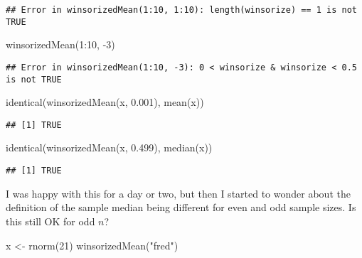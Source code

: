 \documentclass[
]{article}
\newenvironment{Shaded}{\begin{snugshade}}{\end{snugshade}}
\newcommand{\DecValTok}[1]{\textcolor[rgb]{0.00,0.00,0.81}{#1}}
\newcommand{\FloatTok}[1]{\textcolor[rgb]{0.00,0.00,0.81}{#1}}
\newcommand{\FunctionTok}[1]{\textcolor[rgb]{0.00,0.00,0.00}{#1}}
\newcommand{\NormalTok}[1]{#1}
\newcommand{\OtherTok}[1]{\textcolor[rgb]{0.56,0.35,0.01}{#1}}
\newcommand{\SpecialCharTok}[1]{\textcolor[rgb]{0.00,0.00,0.00}{#1}}
\newcommand{\StringTok}[1]{\textcolor[rgb]{0.31,0.60,0.02}{#1}}
\begin{document}
\begin{verbatim}
## Error in winsorizedMean(1:10, 1:10): length(winsorize) == 1 is not TRUE
\end{verbatim}

\begin{Shaded}
\begin{Highlighting}[]
\FunctionTok{winsorizedMean}\NormalTok{(}\DecValTok{1}\SpecialCharTok{:}\DecValTok{10}\NormalTok{, }\SpecialCharTok{{-}}\DecValTok{3}\NormalTok{)}
\end{Highlighting}
\end{Shaded}

\begin{verbatim}
## Error in winsorizedMean(1:10, -3): 0 < winsorize & winsorize < 0.5 is not TRUE
\end{verbatim}

\begin{Shaded}
\begin{Highlighting}[]
\FunctionTok{identical}\NormalTok{(}\FunctionTok{winsorizedMean}\NormalTok{(x, }\FloatTok{0.001}\NormalTok{), }\FunctionTok{mean}\NormalTok{(x))}
\end{Highlighting}
\end{Shaded}

\begin{verbatim}
## [1] TRUE
\end{verbatim}

\begin{Shaded}
\begin{Highlighting}[]
\FunctionTok{identical}\NormalTok{(}\FunctionTok{winsorizedMean}\NormalTok{(x, }\FloatTok{0.499}\NormalTok{), }\FunctionTok{median}\NormalTok{(x))}
\end{Highlighting}
\end{Shaded}

\begin{verbatim}
## [1] TRUE
\end{verbatim}

I was happy with this for a day or two, but then I started to wonder
about the definition of the sample median being different for even and
odd sample sizes. Is this still OK for odd \(n\)?

\begin{Shaded}
\begin{Highlighting}[]
\NormalTok{x }\OtherTok{\textless{}{-}} \FunctionTok{rnorm}\NormalTok{(}\DecValTok{21}\NormalTok{)}
\FunctionTok{winsorizedMean}\NormalTok{(}\StringTok{"fred"}\NormalTok{)}
\end{Highlighting}
\end{Shaded}
\end{document}
